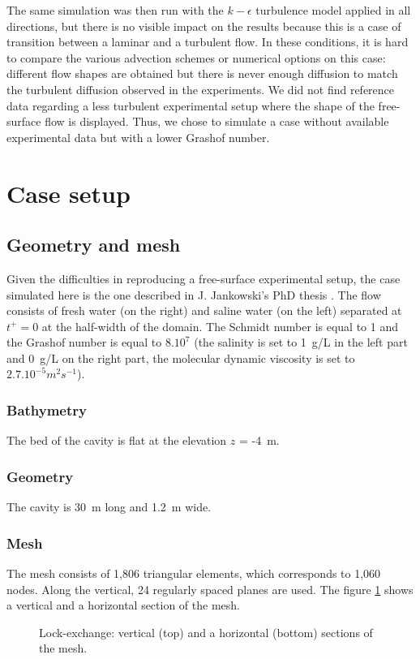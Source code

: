 The same simulation was then run with the $k-\epsilon$ turbulence model applied in all directions,
but there is no visible impact on the results because this is a case of transition
between a laminar and a turbulent flow.
In these conditions, it is hard to compare the various advection
schemes or numerical options on this case:
different flow shapes are obtained but there is never enough
diffusion to match the turbulent diffusion observed in the experiments.
We did not find reference data regarding a less turbulent
experimental setup where the shape of the free-surface flow is displayed.
Thus, we chose to simulate a case without available
experimental data but with a lower Grashof number.

\section{Case setup}

\subsection{Geometry and mesh}
%
Given the difficulties in reproducing a free-surface experimental setup, the case simulated here is
the one described in J. Jankowski's PhD thesis \cite{Jankowski1999}.
The flow consists of fresh water (on the right) and saline water (on the left)
separated at $t^+=0$ at the half-width of the domain.
The Schmidt number is equal to 1 and the Grashof number is equal to $8.10^{7}$
(the salinity is set to 1~g/L in the left part and 0~g/L on the right part,
the molecular dynamic viscosity is set to $2.7.10^{-5}m^2s^{-1}$).
%
\subsubsection{Bathymetry}
%
The bed of the cavity is flat at the elevation $z$ = -4~m.
%
\subsubsection{Geometry}
%
The cavity is 30~m long and 1.2~m wide.
%
\subsubsection{Mesh}
%
The mesh consists of 1,806 triangular elements, which corresponds to 1,060 nodes.
Along the vertical, 24 regularly spaced planes are used.
The figure \ref{fig:lock-mesh} shows a vertical and a horizontal section of the mesh.
\begin{figure}[ht]
  \begin{center}
        \caption{Lock-exchange: vertical (top) and a horizontal (bottom) sections of the mesh.}
    \label{fig:lock-mesh}
  \end{center}
\end{figure}
%
%
%
%
